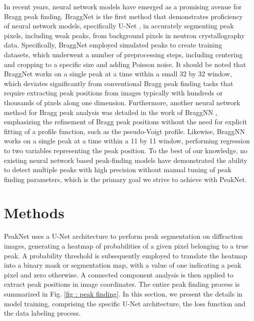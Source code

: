 \documentclass[conference]{IEEEtran}
\newcommand{\peaknet}{PeakNet}
\begin{document}
In recent years, neural network models have emerged as a promising avenue for
Bragg peak finding.  BraggNet \citep{sullivanBraggNetIntegratingBragg2019} is
the first method that demonstrates proficiency of neural network models,
specifically U-Net \citep{ronnebergerUNetConvolutionalNetworks2015}, in
accurately segmenting peak pixels, including weak peaks, from background pixels
in neutron crystallography data.  Specifically, BraggNet employed simulated
peaks to create training datasets, which underwent a number of preprocessing
steps, including centering and cropping to a specific size and adding Poisson
noise.  It should be noted that BraggNet works on a single peak at a time within
a small 32 by 32 window, which deviates significantly from conventional Bragg
peak finding tasks that require extracting peak positions from images typically
with hundreds or thousands of pixels along one dimension.  Furthermore, another
neural network method for Bragg peak analysis was detailed in the work of
BraggNN \citep{liuBraggNNFastXray2021}, emphasizing the refinement of Bragg peak
positions without the need for explicit fitting of a profile function, such as
the pseudo-Voigt profile.  Likewise, BraggNN works on a single peak at a time
within a 11 by 11 window, performing regression to two variables representing
the peak position.  To the best of our knowledge, no existing neural network
based peak-finding models have demonstrated the ability to detect multiple peaks with high precision without manual tuning of peak finding parameters,
which is the primary goal we strive to achieve with \peaknet{}.



\section{Methods}


\peaknet{} uses a U-Net architecture to perform peak segmentation on diffraction
images, generating a heatmap of probabilities of a given pixel belonging to a
true peak.  A probability threshold is subsequently employed to translate the
heatmap into a binary mask or segmentation map, with a value of one indicating a
peak pixel and zero otherwise.  A connected component analysis
\citep{weaverCentrosymmetricCrossSymmetricMatrices1985} is then applied to
extract peak positions in image coordinates.  The entire peak finding process is
summarized in Fig. \ref{fig : peak finding}.  In this section, we present the
details in model training, comprising the specific U-Net architecture, the loss
function and the data labeling process.
\end{document}
